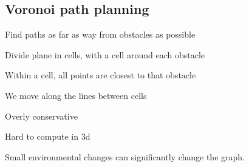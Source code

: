 
\subsection{Voronoi path planning}

Find paths as far as way from obstacles as possible

Divide plane in cells, with a cell around each obstacle

Within a cell, all points are closest to that obstacle

We move along the lines between cells

Overly conservative

Hard to compute in 3d

Small environmental changes can significantly change the graph.

